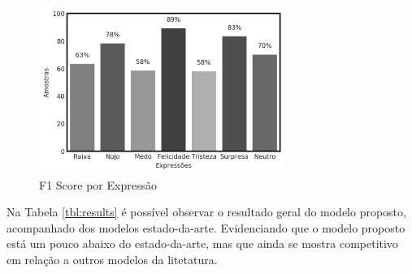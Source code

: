 \begin{figure}[!htb]
    \centering
    \includegraphics[width=8cm]{images/f1_bar.png}
    \caption{F1 Score por Expressão}
    \label{fig:f1_bar}
\end{figure}

Na Tabela \ref{tbl:results} é possível observar o resultado geral do modelo proposto, acompanhado dos modelos estado-da-arte. Evidenciando que o modelo proposto está um pouco abaixo do estado-da-arte, mas que ainda se mostra competitivo em relação a outros modelos da litetatura.


